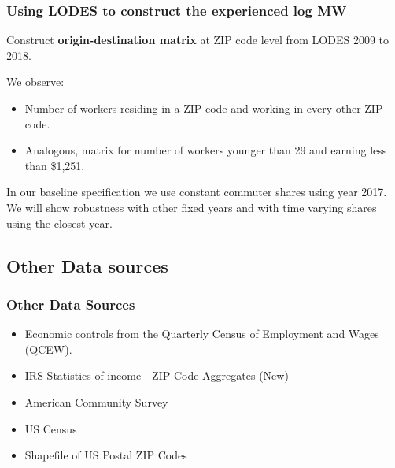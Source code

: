 \documentclass[aspectratio=169, t]{beamer}
\begin{document}
\begin{frame}
	\frametitle{Using LODES to construct the experienced log MW}
	
	\vspace{2mm}
	
	Construct \textbf{origin-destination matrix} at ZIP code level from LODES 2009 to 2018.
	
	\vspace{2mm}

	We observe:
	\begin{itemize} \small
		\item Number of workers residing in a ZIP code and working in every other 
		ZIP code.
		\item Analogous, matrix for number of workers younger than 29 and earning less than 
		\$1,251.
	\end{itemize}
	
	\vspace{2mm}
	
	In our baseline specification we use constant commuter shares using year 2017. We will show robustness with 
	other fixed years and with time varying shares using the closest year.
\end{frame}

\subsection{Other Data sources}

\begin{frame}
	\frametitle{Other Data Sources} 
	
	\begin{itemize}
		\item Economic controls from the Quarterly Census of Employment and Wages 
		{\small (QCEW)}.
		\vspace{2mm} \item IRS Statistics of income - ZIP Code Aggregates (New)
		\vspace{2mm} \item American Community Survey
		\vspace{2mm} \item US Census
		\vspace{2mm} \item Shapefile of US Postal ZIP Codes
	\end{itemize}
\end{frame}
\end{document}
